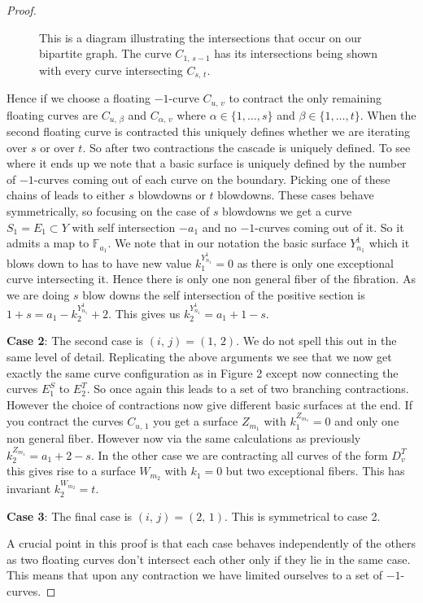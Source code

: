 \documentclass[12pt,a4paper]{book}      %
\theoremstyle{definition}
\newcommand{\mb}[1]{\mathbb{#1}}
\begin{document}
\begin{proof}
\begin{figure}[h]
{}
\caption{This is a diagram illustrating the intersections that occur on our bipartite graph. The curve $C_{1, \, s-1}$  has its intersections being shown with every curve intersecting $C_{s, \, t}$.}
\label{CurveConfigFigure}
\end{figure}
Hence if we choose a floating $-1$-curve $C_{u, \, v}$ to contract the only remaining floating curves are $C_{u, \, \beta}$ and $C_{\alpha , \, v}$ where $\alpha \in \{ 1, \dots, s\}$ and $\beta \in \{1 , \dots , t \}$. When the second floating curve is contracted this uniquely defines whether we are iterating over $s$ or over $t$. So after two contractions the cascade is uniquely defined. To see where it ends up we note that a basic surface is uniquely defined by the number of $-1$-curves coming out of each curve on the boundary. Picking one of these chains of  leads to either $s$ blowdowns or $t$ blowdowns. These cases behave symmetrically, so focusing on the case of $s$ blowdowns we get a curve $S_1 = E_1 \subset Y$ with self intersection $-a_1$ and no $-1$-curves coming out of it. So it admits a map to $\mb{F}_{a_1}$. We note that in our notation the basic surface $Y^1_{n_1}$ which it blows down to has to have new value $k^{Y^1_{n_1}}_1 = 0$ as there is only one exceptional curve intersecting it. Hence there is only one non general fiber of the fibration. As we are doing $s$ blow downs the self intersection of the positive section is $1 + s = a_1 - k^{Y^1_{n_1}}_2  + 2$. This gives us $k^{Y^1_{n_1}}_2  = a_1 + 1 - s$. 

\textbf{Case 2}: The second case is $(i, \, j) = (1, \, 2)$. We do not spell this out in the same level of detail. Replicating the above arguments we see that we now get exactly the same curve configuration as in Figure 2 except now connecting the curves $E_1^S$ to $E_2^T$. So once again this leads to a set of two branching contractions. However the choice of contractions now give different basic surfaces at the end. If you contract the curves $C_{u, \,1}$ you get a surface $Z_{m_1}$ with $k^{Z_{m_1}}_1 = 0$ and only one non general fiber. However now via the same calculations as previously $k^{Z_{m_1}}_2 = a_1 + 2 - s$. In the other case we are contracting all curves of the form $D^T_v$ this gives rise to a surface $W_{m_2}$ with $k_1 = 0$ but two exceptional fibers. This has invariant $k_2^{W_{m_2}} = t$. 

\textbf{Case 3}: The final case is $(i, \, j) = (2, \, 1)$. This is symmetrical to case 2.

A crucial point in this proof is that each case behaves independently of the others as two floating curves don't intersect each other only if they lie in the same case. This means that upon any contraction we have limited ourselves to a set of $-1$-curves.


\end{proof}
\end{document}
